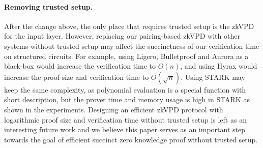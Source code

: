 \paragraph{Removing trusted setup.} After the change above, the only place that requires trusted setup is the zkVPD for the input layer. However, replacing our pairing-based zkVPD with other systems without trusted setup may affect the succinctness of our verification time on structured circuits. For example, using Ligero, Bulletproof and Aurora as a black-box would increase the verification time to $O(n)$, and using Hyrax would increase the proof size and verification time to $O(\sqrt{n})$. Using STARK may keep the same complexity, as polynomial evaluation is a special function with short description, but the prover time and memory usage is high in STARK as shown in the experiments. Designing an efficient zkVPD protocol with logarithmic proof size and verification time without trusted setup is left as an interesting future work and we believe this paper serves as an important step towards the goal of efficient succinct zero knowledge proof without trusted setup. 